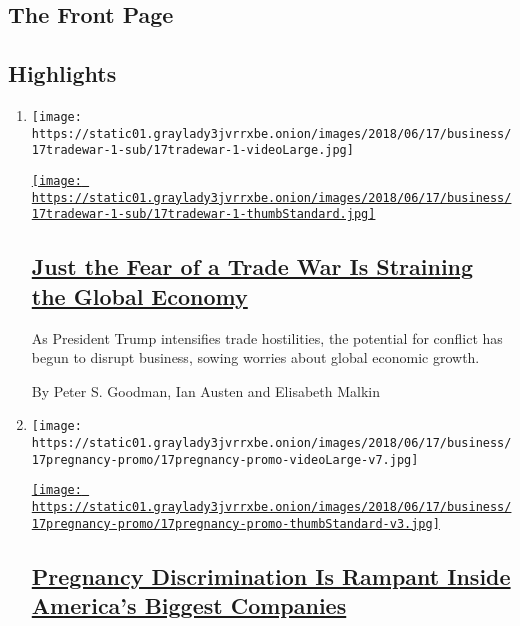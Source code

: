 \hypertarget{the-front-page}{%
\subsection{The Front Page}\label{the-front-page}}

\hypertarget{highlights}{%
\subsection{Highlights}\label{highlights}}

\begin{enumerate}
\def\labelenumi{\arabic{enumi}.}
\item
  \texttt{[image: https://static01.graylady3jvrrxbe.onion/images/2018/06/17/business/17tradewar-1-sub/17tradewar-1-videoLarge.jpg]}

  \href{/2018/06/16/business/tariffs-trade-war.html}{\texttt{[image: https://static01.graylady3jvrrxbe.onion/images/2018/06/17/business/17tradewar-1-sub/17tradewar-1-thumbStandard.jpg]}}

  \hypertarget{just-the-fear-of-a-trade-war-is-straining-the-global-economy}{%
  \subsection{\texorpdfstring{\href{/2018/06/16/business/tariffs-trade-war.html}{Just
  the Fear of a Trade War Is Straining the Global
  Economy}}{Just the Fear of a Trade War Is Straining the Global Economy}}\label{just-the-fear-of-a-trade-war-is-straining-the-global-economy}}

  As President Trump intensifies trade hostilities, the potential for
  conflict has begun to disrupt business, sowing worries about global
  economic growth.

  By Peter S. Goodman, Ian Austen and Elisabeth Malkin
\item
  \texttt{[image: https://static01.graylady3jvrrxbe.onion/images/2018/06/17/business/17pregnancy-promo/17pregnancy-promo-videoLarge-v7.jpg]}

  \href{/interactive/2018/06/15/business/pregnancy-discrimination.html}{\texttt{[image: https://static01.graylady3jvrrxbe.onion/images/2018/06/17/business/17pregnancy-promo/17pregnancy-promo-thumbStandard-v3.jpg]}}

  \hypertarget{pregnancy-discrimination-is-rampant-inside-americas-biggest-companies}{%
  \subsection{\texorpdfstring{\href{/interactive/2018/06/15/business/pregnancy-discrimination.html}{Pregnancy
  Discrimination Is Rampant Inside America's Biggest
  Companies}}{Pregnancy Discrimination Is Rampant Inside America's Biggest Companies}}\label{pregnancy-discrimination-is-rampant-inside-americas-biggest-companies}}


\end{enumerate}
